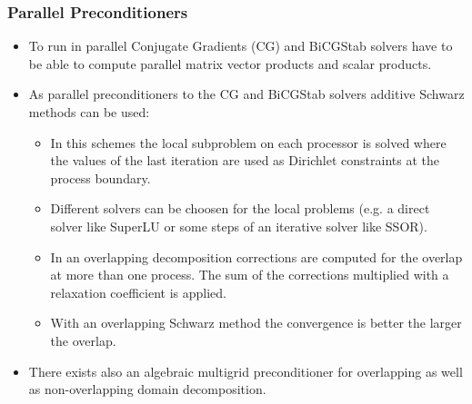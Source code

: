 \begin{frame}
\frametitle{Parallel Preconditioners}
\begin{itemize}
\item To run in parallel Conjugate Gradients (CG) and BiCGStab solvers have to be able to compute parallel matrix vector
products and scalar products.
\item As parallel preconditioners to the CG and BiCGStab solvers additive Schwarz methods can be used:
\begin{itemize}
\item In this schemes the local subproblem on each processor is solved
where the values of the last iteration are used as Dirichlet constraints at the process boundary.
\item Different solvers can be choosen for the local problems (e.g. a direct solver like SuperLU or some steps of an
iterative solver like SSOR).
\item In an overlapping decomposition corrections are computed for the overlap at more than one process. The sum of the corrections multiplied with a relaxation
coefficient is applied.
\item With an overlapping Schwarz method the convergence is better the larger the overlap.
\end{itemize}
\item There exists also an algebraic multigrid preconditioner for overlapping as well as non-overlapping domain decomposition.
\end{itemize}
\end{frame}


